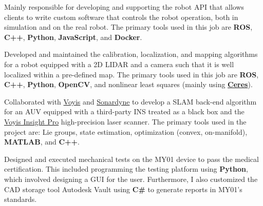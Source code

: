 \documentclass[10pt,letter]{altacv}
\begin{document}

Mainly responsible for developing and supporting the robot API that allows clients to write custom software that controls the robot operation, both in simulation and on the real robot.
The primary tools used in this job are \textbf{ROS}, \textbf{C++}, \textbf{Python}, \textbf{JavaScript}, and \textbf{Docker}.

\divider

Developed and maintained the calibration, localization, and mapping algorithms for a robot equipped with a 2D LIDAR and a camera such that it is well localized within a pre-defined map.
The primary tools used in this job are \textbf{ROS}, \textbf{C++}, \textbf{Python}, \textbf{OpenCV}, and nonlinear least squares (mainly using \href{https://github.com/ceres-solver/ceres-solver}{\textbf{Ceres}}).

\divider

Collaborated with \href{https://voyis.com/}{Voyis} and \href{https://www.sonardyne.com/}{Sonardyne} to develop a SLAM back-end algorithm for an AUV equipped with a third-party INS treated as a black box and the \href{https://voyis.com/insight-pro}{Voyis Insight Pro} high-precision laser scanner.
The primary tools used in the project are:
Lie groups, state estimation, optimization (convex, on-manifold), \textbf{MATLAB}, and \textbf{C++}.

\divider

Designed and executed mechanical tests on the MY01 device to pass the medical certification.
This included programming the testing platform using \textbf{Python}, which involved designing a GUI for the user.
Furthermore, I also customized the CAD storage tool Autodesk Vault using \textbf{C\#} to generate reports in MY01's standards.
\end{document}
